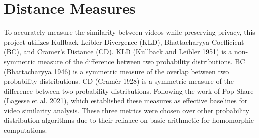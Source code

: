 \section{Distance Measures}

To accurately measure the similarity between videos while preserving privacy, this project utilizes Kullback-Leibler Divergence (KLD), Bhattacharyya Coefficient (BC), and Cramer’s Distance (CD). KLD (Kullback and Leibler 1951) is a non-symmetric measure of the difference between two probability distributions. BC (Bhattacharyya 1946) is a symmetric measure of the overlap between two probability distributions. CD (Cramér 1928) is a symmetric measure of the difference between two probability distributions. Following the work of Pop-Share (Lagesse et al. 2021), which established these measures as effective baselines for video similarity analysis. These three metrics were chosen over other probability distribution algorithms due to their reliance on basic arithmetic for homomorphic computations.
